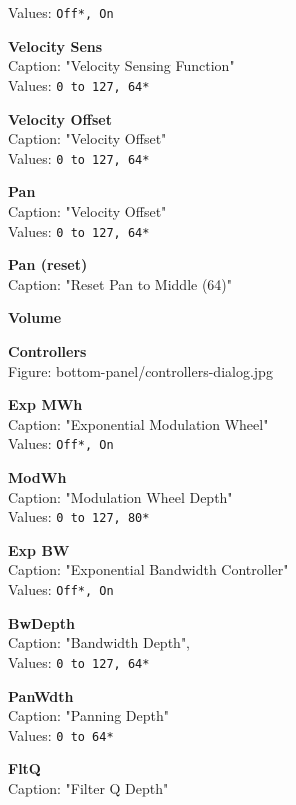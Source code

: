 \documentclass[
 11pt,
 twoside,
 a4paper,
 headinclude,
 footinclude,
 final                                 %
]{article}
\begin{document}
\begin{enumber}
\begin{enumber}
         Values: \texttt{Off*, On}
      \item \textbf{Velocity Sens} \\
         Caption: "Velocity Sensing Function" \\
         Values: \texttt{0 to 127, 64*}
      \item \textbf{Velocity Offset} \\
         Caption: "Velocity Offset" \\
         Values: \texttt{0 to 127, 64*}
      \item \textbf{Pan} \\
         Caption: "Velocity Offset" \\
         Values: \texttt{0 to 127, 64*}
      \item \textbf{Pan (reset)} \\
         Caption: "Reset Pan to Middle (64)"
      \item \textbf{Volume}
      \item \textbf{Controllers} \\
         Figure: bottom-panel/controllers-dialog.jpg
      \begin{enumber}
         \item \textbf{Exp MWh} \\
            Caption: "Exponential Modulation Wheel" \\
            Values: \texttt{Off*, On}
         \item \textbf{ModWh} \\
            Caption: "Modulation Wheel Depth" \\
            Values: \texttt{0 to 127, 80*}
         \item \textbf{Exp BW} \\
            Caption: "Exponential Bandwidth Controller" \\
            Values: \texttt{Off*, On}
         \item \textbf{BwDepth} \\
            Caption: "Bandwidth Depth", \\
            Values: \texttt{0 to 127, 64*}
         \item \textbf{PanWdth} \\
            Caption: "Panning Depth" \\
            Values: \texttt{0 to 64*}
         \item \textbf{FltQ} \\
            Caption: "Filter Q Depth" \\

\end{enumber}
\end{enumber}
\end{enumber}
\end{document}
